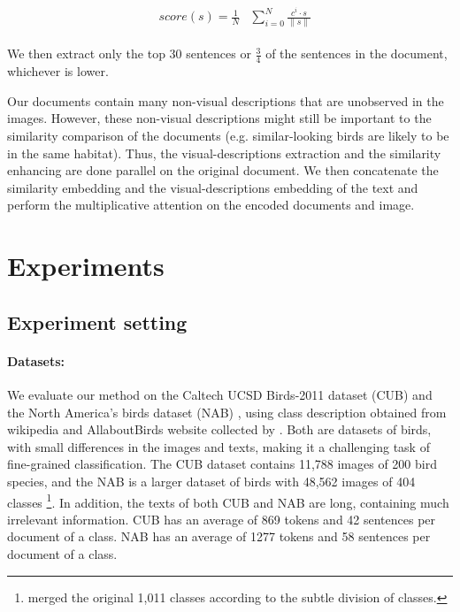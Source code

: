 \documentclass[11pt,a4paper]{article}
\begin{document}
\begin{equation}
\begin{aligned}
\begin{split}
\label{eq:score}
&score(s)=  \frac{1}{N}
&\sum_{i=0}^{N} \frac{c^i\cdot s}{\| s\| }
\end{split}
\end{aligned}
\end{equation}

 We then extract only the top 30 sentences or $\frac{3}{4}$ of the sentences in the document, whichever is lower.\par   

\par




Our documents contain many non-visual descriptions that are unobserved in the images. However, these non-visual descriptions might still be important to the similarity comparison of the documents (e.g. similar-looking birds are likely to be in the same habitat). Thus, the visual-descriptions extraction and the similarity enhancing are done parallel on the original document. We then concatenate the similarity embedding and the visual-descriptions embedding of the text and perform the multiplicative attention on the encoded documents and image.

\section{Experiments}

\subsection{Experiment setting}

\paragraph{Datasets:}  We evaluate our method on the Caltech UCSD Birds-2011 dataset (CUB) \citet{wah2011caltech} and the North America’s birds dataset (NAB) \cite{van2015building}, using class description obtained from wikipedia and AllaboutBirds website \cite{AllaboutBirds} collected by \citet{elhoseiny2017link}. 
Both are datasets of birds, with small differences in the images and texts, making it a challenging task of fine-grained classification. The CUB dataset contains 11,788 images of 200 bird species, and the NAB
is a larger dataset of birds with 48,562 images of 404 classes \footnote{\citet{elhoseiny2017link} merged the original 1,011 classes according to the subtle division of classes.}.
In addition, the texts of both CUB and NAB are long, containing much irrelevant information. CUB has an average of 869 tokens and 42 sentences per document of a class. NAB has an average of 1277 tokens and 58 sentences per document of a class. 
\end{document}
